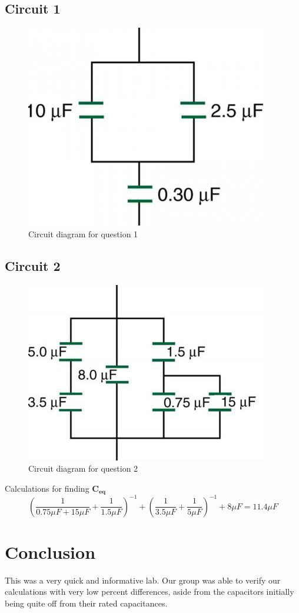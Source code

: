 \documentclass[titlepage]{article}
\begin{document}
    	\subsection{Circuit 1}

        \begin{figure}[hbt!]
            \centering
            \caption{Circuit diagram for question 1}
            \includegraphics{questions/1}
        \end{figure}



    
    	\subsection{Circuit 2}
        \begin{figure}[hbt!]
            \centering
            \caption{Circuit diagram for question 2}
            \includegraphics{questions/2}
        \end{figure}

    {{Calculations for finding $\mathbf{C_{eq}}$}}
        $$\left( \frac{1}{0.75\mu F+15\mu F}+\frac{1}{1.5\mu F} \right)^{-1}+\left(\frac{1}{3.5\mu F}+\frac{1}{5\mu F}\right)^{-1}+8\mu F  = 11.4 \mu F$$


    
    
  	\section{Conclusion}
    This was a very quick and informative lab. Our group was able to verify our calculations with very low percent differences, aside from the capacitors initially being quite off from their rated capacitances. 
\end{document}
